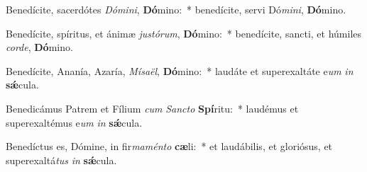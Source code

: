 \item Benedícite, sacerdótes \textit{Dó}\textit{mi}\textit{ni}, \textbf{Dó}mino:~* benedícite, servi Dó\textit{mi}\textit{ni}, \textbf{Dó}mino.
\item Benedícite, spíritus, et ánimæ \textit{jus}\textit{tó}\textit{rum}, \textbf{Dó}mino:~* benedícite, sancti, et húmiles \textit{cor}\textit{de}, \textbf{Dó}mino.
\item Benedícite, Ananía, Azaría, \textit{Mí}\textit{sa}\textit{ël}, \textbf{Dó}mino:~* laudáte et superexaltáte e\textit{um} \textit{in} \textbf{sǽ}cula.
\item Benedicámus Patrem et Fílium \textit{cum} \textit{Sanc}\textit{to} \textbf{Spí}ritu:~* laudémus et superexaltémus e\textit{um} \textit{in} \textbf{sǽ}cula.
\item Benedíctus es, Dómine, in fir\textit{ma}\textit{mén}\textit{to} \textbf{cæ}li:~* et laudábilis, et gloriósus, et superexaltá\textit{tus} \textit{in} \textbf{sǽ}cula.
